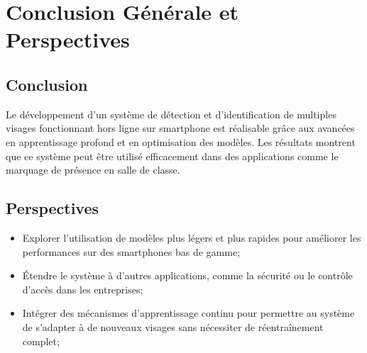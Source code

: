 \chapter*{Conclusion Générale et Perspectives}

\section{Conclusion}

\hspace{0.65cm} Le développement d'un système de détection et d'identification de multiples visages fonctionnant hors ligne sur smartphone est réalisable grâce aux avancées en apprentissage profond et en optimisation des modèles. Les résultats montrent que ce système peut être utilisé efficacement dans des applications comme le marquage de présence en salle de classe.

\section{Perspectives}

\begin{itemize}
\item Explorer l'utilisation de modèles plus légers et plus rapides pour améliorer les performances sur des smartphones bas de gamme;
\item Étendre le système à d'autres applications, comme la sécurité ou le contrôle d'accès dans les entreprises;
\item Intégrer des mécanismes d'apprentissage continu pour permettre au système de s'adapter à de nouveaux visages sans nécessiter de réentraînement complet;

\end{itemize}




